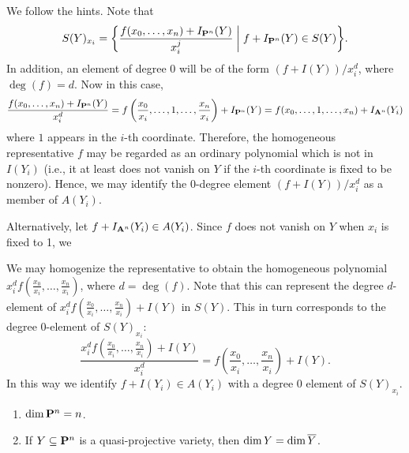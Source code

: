 \documentclass[10pt]{amsart}
\begin{document}
\begin{solution}
    \begin{luke}
        We follow the hints. Note that 
        \[
            S(Y)_{x_i}
            =
            \bigg\{ \frac{f(x_0, \dots, x_n) + I_{\pp^n}(Y)}{x_i^j} \;\bigg|\; f + I_{\pp^n}(Y) \in S(Y) \bigg\}.
        \]
        In addition, an element of degree  0 will be of the form $(f + I(Y))/x_i^d$, where $\deg(f) = d$. 
        Now in this case, 
        \[
            \frac{f(x_0, \dots, x_n) + I_{\pp^n}(Y)}{x_i^d}
            =
            f\left( \frac{x_0}{x_i}, \dots, 1, \dots, \frac{x_n}{x_i} \right) + I_{\pp^n}(Y)
            =
            f(x_0, \dots, 1, \dots, x_n) + I_{\aa^n}(Y_i)
        \]
        where $1$ appears in the $i$-th coordinate. Therefore, the homogeneous 
        representative $f$ may be regarded as an ordinary polynomial which is 
        not in $I(Y_i)$ (i.e., it at least does not vanish on $Y$ if the $i$-th coordinate is 
        fixed to be nonzero). Hence, we may identify the 0-degree element 
        $(f + I(Y))/x_i^d$ as a member of $A(Y_i)$. 

        Alternatively, let $f + I_{\aa^n}(Y_i) \in A(Y_i)$. 
        Since $f$ does not vanish on $Y$ when $x_i$ is fixed to 1, we 
        

        We
        may homogenize the representative to 
        obtain the homogeneous polynomial $x_i^df\left( \frac{x_0}{x_i}, \dots, \frac{x_n}{x_i} \right)$, 
        where $d = \deg(f)$. Note that this can represent the
        degree $d$-element of $x_i^df\left( \frac{x_0}{x_i}, \dots, \frac{x_n}{x_i} \right) + I(Y)$ in 
        $S(Y)$. This in turn corresponds to the degree $0$-element of 
        $S(Y)_{x_i}$: 
        \[
            \frac{x_i^df\left( \frac{x_0}{x_i}, \dots, \frac{x_n}{x_i} \right) + I(Y)}{x_i^d}
            =
            f\left( \frac{x_0}{x_i}, \dots, \frac{x_n}{x_i} \right) + I(Y).
        \]
        In this way we identify $f + I(Y_i) \in A(Y_i)$ with a degree 0 element of $S(Y)_{x_i}$. 
        
        
        


        
    
    \end{luke}
\end{solution}

\begin{exercise}[2.7]
    \begin{enumerate}
        \item $\Dim \bbP^n = n$.
        \item If $Y \subseteq \bbP^n$ is a quasi-projective variety, then $\Dim Y =
          \Dim \overline{Y}$.
    \end{enumerate}
\end{exercise}
\end{document}
